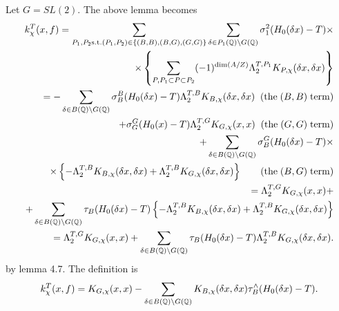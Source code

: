 \begin{example}
Let $G=SL(2)$. The above lemma becomes 
\begin{eqnarray*}
k_\chi ^T(x,f)=
\sum_{ P_1,P_2 {\rm s.t.} (P_1,P_2)\in  \{(B,B),(B,G),(G,G)\}} 
\sum_{\delta \in P_1(\qqq )\backslash G(\qqq )}
\sigma_1^2(H_0(\delta x)-T)\times  \\
\ \times \left\{ \sum_{ P , P_1\subset P\subset P_2 }
(-1)^{\dim (A/Z)}\Lambda _2^{T,P_1}K_{P,\chi }(\delta x,\delta x)\right\}  \\
=-\sum_{\delta \in B(\qqq )\backslash G(\qqq )}\sigma _B^B(H_0(\delta
x)-T)\Lambda _2^{T,B}K_{B,\chi }(\delta x,\delta x)\;\;(\mathrm{the}\;(B,B)\;%
\mathrm{term}) \\
+\sigma _G^G(H_0(x)-T)\Lambda _2^{T,G}K_{G,\chi }(x,x)\;\;(\mathrm{the}%
\;(G,G)\;\mathrm{term}) \\
+\sum_{\delta \in B(\qqq )\backslash G(\qqq )}\sigma _B^G(H_0(\delta
x)-T)\times  \\
\;\;\times \left\{ -\Lambda _2^{T,B}K_{B,\chi }(\delta x,\delta x)+\Lambda
_2^{T,B}K_{G,\chi }(\delta x,\delta x)\right\} \;\;\;\;\;\;\;(\mathrm{the}%
\;(B,G)\;\mathrm{term}) \\
=\Lambda _2^{T,G}K_{G,\chi }(x,x)+ \\
+\sum_{\delta \in B(\qqq )\backslash G(\qqq )}\tau _B(H_0(\delta
x)-T)\left\{ -\Lambda _2^{T,B}K_{B,\chi }(\delta x,\delta x)+\Lambda
_2^{T,B}K_{G,\chi }(\delta x,\delta x)\right\}  \\
=\Lambda _2^{T,G}K_{G,\chi }(x,x)+\sum_{\delta \in B(\qqq )\backslash G(%
\qqq )}\tau _B(H_0(\delta x)-T)\Lambda _2^{T,B}K_{G,\chi }(\delta x,\delta
x).
\end{eqnarray*}
by lemma 4.7. The definition is 
\begin{equation}
k_\chi ^T(x,f)=K_{G,\chi }(x,x)-\sum_{\delta \in B(\qqq )\backslash G(\mathbb{%
Q})}K_{B,\chi }(\delta x,\delta x)\tau _B^{\wedge }(H_0(\delta x)-T).
\end{equation}


\end{example}
